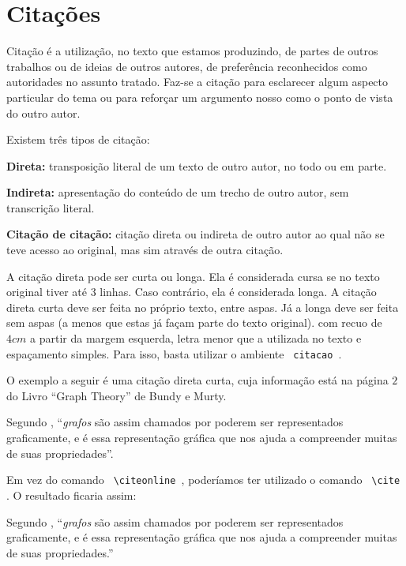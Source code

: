 \chapter{Citações}\label{chp:citacoes}

    Citação é a utilização, no texto que estamos produzindo, de partes de outros trabalhos ou de ideias de outros autores, de preferência reconhecidos como autoridades no assunto tratado. Faz-se a citação para esclarecer algum aspecto particular do tema ou para reforçar um argumento nosso como o ponto de vista do outro autor.

    Existem três tipos de citação:

    \begin{alineas}
        \item \textbf{Direta:} transposição literal de um texto de outro autor, no todo ou em parte.
        \item \textbf{Indireta:} apresentação do conteúdo de um trecho de outro autor, sem transcrição literal.
        \item \textbf{Citação de citação:} citação direta ou indireta de outro autor ao qual não se teve acesso ao original, mas sim através de outra citação.
    \end{alineas}

    A citação direta pode ser curta ou longa. Ela é considerada cursa se no texto original tiver até 3 linhas. Caso contrário, ela é considerada longa. A citação direta curta deve ser feita no próprio texto, entre aspas. Já a longa deve ser feita sem aspas (a menos que estas já façam parte do texto original). com recuo de $4cm$ a partir da margem esquerda, letra menor que a utilizada no texto e espaçamento simples. Para isso, basta utilizar o ambiente \verb| citacao |.

    O exemplo a seguir é uma citação direta curta, cuja informação está na página $2$ do Livro ``Graph Theory'' de Bundy e Murty.

    Segundo , ``\emph{grafos} são assim chamados por poderem ser representados graficamente, e é essa representação gráfica que nos ajuda a compreender muitas de suas propriedades''.

    Em vez do comando \verb| \citeonline |, poderíamos ter utilizado o comando \verb| \cite |. O resultado ficaria assim:

    Segundo \cite[p. 2]{BondyMurty}, ``\emph{grafos} são assim chamados por poderem ser representados graficamente, e é essa representação gráfica que nos ajuda a compreender muitas de suas propriedades.''

